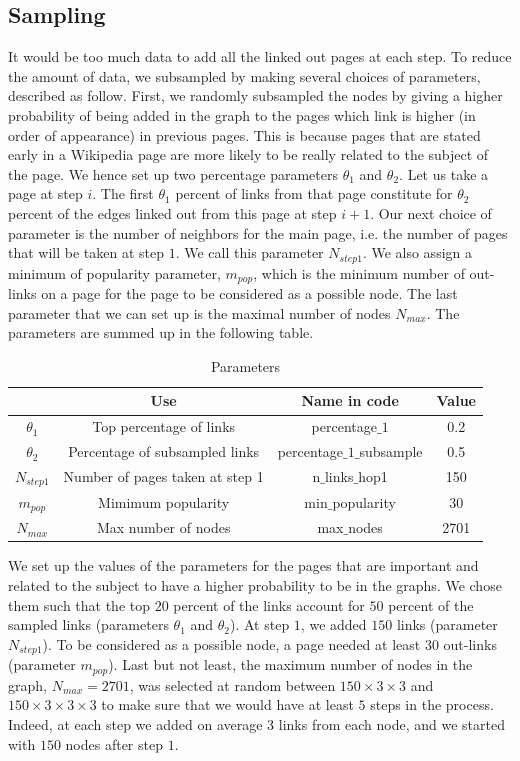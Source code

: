 \documentclass[conference]{IEEEtran}
\begin{document}
\subsection{Sampling}
It would be too much data to add all the linked out pages at each step.  To reduce the amount of data, we  subsampled by making several choices of parameters, described as follow. First, we randomly subsampled the nodes by giving a higher probability of being added in the graph to the pages which link is higher (in order of appearance) in previous pages. This is because pages that are stated early in a Wikipedia page are more likely to be really related to the subject of the page. We hence set up two percentage parameters $\theta_1$ and $\theta_2$. Let us take a page at step $i$. The first $\theta_1$ percent of links from that page constitute for $\theta_2$ percent of the edges linked out from this page at step $i+1$. Our next choice of parameter is the number of neighbors for the main page, i.e. the number of pages that will be taken at step $1$. We call this parameter $N_{step1}$. We also assign a minimum of popularity parameter, $m_{pop}$, which is the minimum number of out-links on a page for the page to be considered as a possible node. The last parameter that we can set up is the maximal number of nodes $N_{max}$. The parameters are summed up in the following table. 

\begin{table}[htbp]
\caption{Parameters}
\begin{center}
\begin{tabular}{|c|c|c|c|}
\hline
 & Use & Name in code & Value \\
\hline
$\theta_1$& Top  percentage of links  & percentage$\_1$ & 0.2 \\
\hline
$\theta_2$& Percentage of subsampled links &  percentage$\_1\_$subsample &  0.5\\
\hline
$N_{step1}$  &  Number of pages taken at step 1   & n$\_$links$\_$hop1  & 150  \\
\hline
$m_{pop}$  & Mimimum popularity  & min$\_$popularity &30 \\
\hline
$N_{max}$  &  Max number of nodes & max$\_$nodes&  2701 \\
\hline
\end{tabular}
\end{center}
\end{table}

We set up the values of the parameters for the pages that are important and related to the subject to have a higher probability to be in the graphs. We chose them such that the top $20$ percent of the links account for $50$ percent of the sampled links (parameters $\theta_1$ and $\theta_2$). At step $1$, we added $150$ links (parameter $N_{step1}$). To be considered as a possible node, a page needed at least $30$ out-links (parameter $m_{pop}$). Last but not least, the maximum number of nodes in the graph, $N_{max}=2701$, was selected at random between $150 \times 3 \times 3$ and $150 \times 3 \times 3 \times 3$ to make sure that we would have at least $5$ steps in the process. Indeed, at each step we added on average $3$ links from each node, and we started with $150$ nodes after step $1$.
\end{document}
